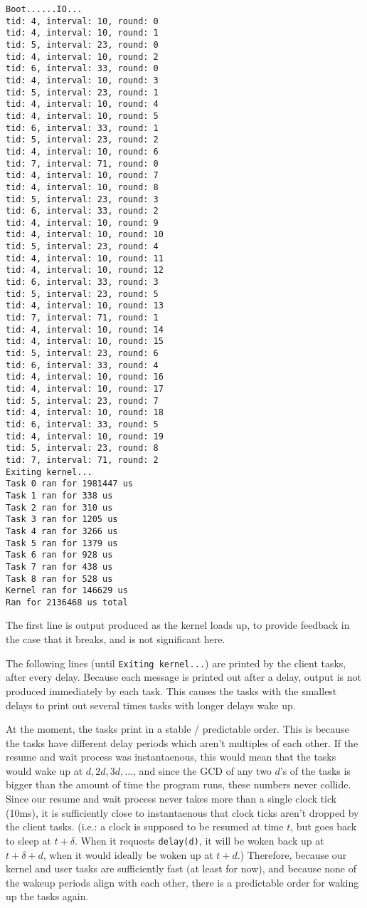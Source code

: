 \documentclass[titlepage]{article}
\begin{document}
\begin{verbatim}
Boot......IO...
tid: 4, interval: 10, round: 0
tid: 4, interval: 10, round: 1
tid: 5, interval: 23, round: 0
tid: 4, interval: 10, round: 2
tid: 6, interval: 33, round: 0
tid: 4, interval: 10, round: 3
tid: 5, interval: 23, round: 1
tid: 4, interval: 10, round: 4
tid: 4, interval: 10, round: 5
tid: 6, interval: 33, round: 1
tid: 5, interval: 23, round: 2
tid: 4, interval: 10, round: 6
tid: 7, interval: 71, round: 0
tid: 4, interval: 10, round: 7
tid: 4, interval: 10, round: 8
tid: 5, interval: 23, round: 3
tid: 6, interval: 33, round: 2
tid: 4, interval: 10, round: 9
tid: 4, interval: 10, round: 10
tid: 5, interval: 23, round: 4
tid: 4, interval: 10, round: 11
tid: 4, interval: 10, round: 12
tid: 6, interval: 33, round: 3
tid: 5, interval: 23, round: 5
tid: 4, interval: 10, round: 13
tid: 7, interval: 71, round: 1
tid: 4, interval: 10, round: 14
tid: 4, interval: 10, round: 15
tid: 5, interval: 23, round: 6
tid: 6, interval: 33, round: 4
tid: 4, interval: 10, round: 16
tid: 4, interval: 10, round: 17
tid: 5, interval: 23, round: 7
tid: 4, interval: 10, round: 18
tid: 6, interval: 33, round: 5
tid: 4, interval: 10, round: 19
tid: 5, interval: 23, round: 8
tid: 7, interval: 71, round: 2
Exiting kernel...
Task 0 ran for 1981447 us
Task 1 ran for 338 us
Task 2 ran for 310 us
Task 3 ran for 1205 us
Task 4 ran for 3266 us
Task 5 ran for 1379 us
Task 6 ran for 928 us
Task 7 ran for 438 us
Task 8 ran for 528 us
Kernel ran for 146629 us
Ran for 2136468 us total
\end{verbatim}

The first line is output produced as the kernel loads up, to provide feedback in the case that it breaks,
and is not significant here.

The following lines (until \texttt{Exiting kernel...}) are printed by the client tasks, after every delay.
Because each message is printed out after a delay, output is not produced immediately by each task.
This causes the tasks with the smallest delays to print out several times tasks with longer delays wake up.

At the moment, the tasks print in a stable / predictable order.
This is because the tasks have different delay periods which aren't multiples of each other.
If the resume and wait process was instantaenous, this would mean that the tasks would wake up at $d, 2d, 3d, \ldots$,
and since the GCD of any two $d$'s of the tasks is bigger than the amount of time the program runs, these
numbers never collide.
Since our resume and wait process never takes more than a single clock tick (10ms), it is sufficiently close to instantaenous
that clock ticks aren't dropped by the client tasks.
(i.e.: a clock is supposed to be resumed at time $t$, but goes back to sleep at $t + \delta$.
When it requests \texttt{delay(d)}, it will be woken back up at $t + \delta + d$, when it would ideally
be woken up at $t + d$.)
Therefore, because our kernel and user tasks are sufficiently fast (at least for now), and because
none of the wakeup periods align with each other, there is a predictable order for waking up the tasks again.
\end{document}
